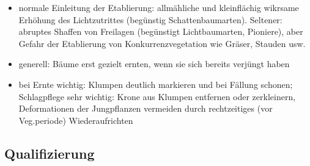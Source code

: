 \documentclass{article}
\begin{document}
\begin{itemize}
    \item normale Einleitung der Etablierung: allmähliche und kleinflächig wikrsame Erhöhung des Lichtzutrittes (begünstig Schattenbaumarten). Seltener: abruptes Shaffen von Freilagen (begünstigt Lichtbaumarten, Pioniere), aber Gefahr der Etablierung von Konkurrenzvegetation wie  Gräser, Stauden usw.
    
    \item generell: Bäume erst gezielt ernten, wenn sie sich bereits verjüngt haben
    
    \item bei Ernte wichtig: Klumpen deutlich markieren und bei Fällung schonen; Schlagpflege sehr wichtig: Krone aus Klumpen entfernen oder zerkleinern, Deformationen der Jungpflanzen vermeiden durch rechtzeitiges (vor Veg.periode) Wiederaufrichten
      
\end{itemize} 
  
  
  
\subsection{Qualifizierung}
\end{document}

